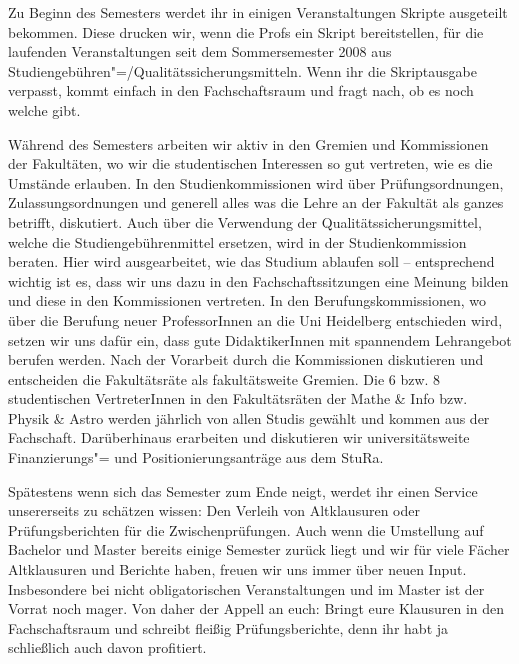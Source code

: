 Zu Beginn des Semesters werdet ihr in einigen Veranstaltungen Skripte
ausgeteilt bekommen. Diese drucken wir, wenn die Profs ein Skript
bereitstellen, für die laufenden Veranstaltungen seit dem Sommersemester 2008
aus Studiengebühren"=/Qualitätssicherungsmitteln. Wenn ihr die Skriptausgabe
verpasst, kommt einfach in den Fachschaftsraum und fragt nach, ob es noch
welche gibt.

Während des Semesters arbeiten wir aktiv in den Gremien und Kommissionen der
Fakultäten, wo wir die studentischen Interessen so gut vertreten, wie es die
Umstände erlauben.  In den Studienkommissionen wird über Prüfungsordnungen,
Zulassungsordnungen und generell alles was die Lehre an der Fakultät als ganzes
betrifft, diskutiert. Auch über die Verwendung der Qualitätssicherungsmittel,
welche die Studiengebührenmittel ersetzen, wird in der Studienkommission
beraten. Hier wird ausgearbeitet, wie das Studium ablaufen soll -- entsprechend
wichtig ist es, dass wir uns dazu in den Fachschaftssitzungen eine Meinung
bilden und diese in den Kommissionen vertreten.  In den Berufungskommissionen,
wo über die Berufung neuer ProfessorInnen an die Uni Heidelberg entschieden
wird, setzen wir uns dafür ein, dass gute DidaktikerInnen mit spannendem
Lehrangebot berufen werden.  Nach der Vorarbeit durch die Kommissionen
diskutieren und entscheiden die Fakultätsräte als fakultätsweite Gremien. Die 6
bzw. 8 studentischen VertreterInnen in den Fakultätsräten der Mathe \& Info
bzw. Physik \& Astro werden jährlich von allen Studis gewählt und kommen aus
der Fachschaft.  Darüberhinaus erarbeiten und diskutieren wir universitätsweite
Finanzierungs"= und Positionierungsanträge aus dem \gls{StuRa}.

Spätestens wenn sich das Semester zum Ende neigt, werdet ihr einen Service
unsererseits zu schätzen wissen: Den Verleih von Altklausuren oder
Prüfungsberichten für die Zwischenprüfungen. Auch wenn die Umstellung auf
Bachelor und Master bereits einige Semester zurück liegt und wir für viele
Fächer Altklausuren und Berichte haben, freuen wir uns immer über neuen Input.
Insbesondere bei nicht obligatorischen Veranstaltungen und im Master ist der
Vorrat noch mager. Von daher der Appell an euch: Bringt eure Klausuren in
den Fachschaftsraum und schreibt fleißig Prüfungsberichte, denn ihr habt ja
schließlich auch davon profitiert.



